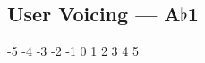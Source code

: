 \subsection{User Voicing --- A$\flat$1}




































-5
-4
-3
-2
-1
0
1
2
3
4
5

